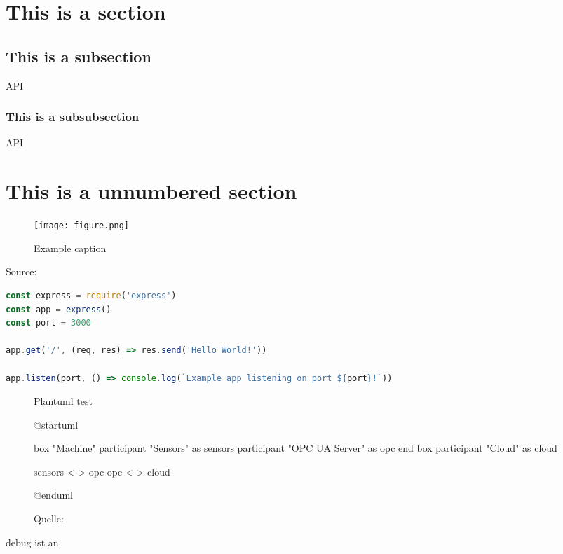 
\section{This is a section}
\blindtext {}
\subsection{This is a subsection}
\blindtext \ac{API}
\subsubsection{This is a subsubsection}
\blindtext \ac{API}
\section*{This is a unnumbered section}

\begin{figure}[ht] 
    \centering
    \caption{Example caption}
    \texttt{[image: figure.png]} 
    \label{fig:goodreference}
\end{figure}

\blindtext

\begin{subcaptionenv}{Source: }
    \begin{lstlisting}[caption={Express Example}, language=javascript]
const express = require('express')
const app = express()
const port = 3000

app.get('/', (req, res) => res.send('Hello World!'))

app.listen(port, () => console.log(`Example app listening on port ${port}!`))
    \end{lstlisting}
\end{subcaptionenv}

\blindtext

\begin{figure}[h]
    \centering
    \caption{Plantuml test}
    \begin{plantuml}
        @startuml

        box "Machine"
            participant "Sensors" as sensors
            participant "OPC UA Server" as opc
        end box
        participant "Cloud" as cloud

        sensors <-> opc
        opc <-> cloud

        @enduml    
    \end{plantuml}
    \caption*{\footnotesize{Quelle: }}
    \label{fig:plantuml_test}
\end{figure}

\ifdebug{}debug ist an\fi


